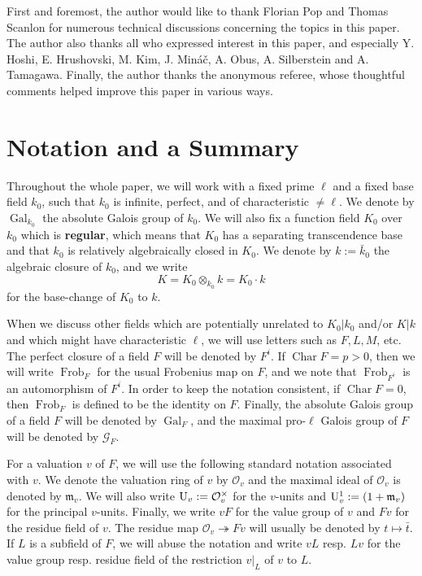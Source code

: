 \documentclass[11pt]{amsart}
\theoremstyle{definition}
\theoremstyle{remark}
\numberwithin{equation}{section}
\DeclareMathOperator{\Gal}{Gal}
\DeclareMathOperator{\Char}{Char}
\newcommand{\U}{{\rm U}}
\newcommand{\Gc}{\mathcal{G}}
\newcommand{\Oc}{\mathcal{O}}
\newcommand{\mf}{\mathfrak{m}}
\newcommand{\Frob}{\operatorname{Frob}}
\newcommand{\Galk}{{\Gal_{k_0}}}
\begin{document}
First and foremost, the author would like to thank Florian Pop and Thomas Scanlon for numerous technical discussions concerning the topics in this paper.
The author also thanks all who expressed interest in this paper, and especially Y. Hoshi, E. Hrushovski, M. Kim, J. Min\'a\v{c}, A. Obus, A. Silberstein and A. Tamagawa.
Finally, the author thanks the anonymous referee, whose thoughtful comments helped improve this paper in various ways.

\section{Notation and a Summary}
\label{section: summary}


Throughout the whole paper, we will work with a fixed prime $\ell$ and a fixed base field $k_0$, such that $k_0$ is infinite, perfect, and of characteristic $\neq \ell$.
We denote by $\Galk$ the absolute Galois group of $k_0$.
We will also fix a function field $K_0$ over $k_0$ which is {\bf regular}, which means that $K_0$ has a separating transcendence base and that $k_0$ is relatively algebraically closed in $K_0$.
We denote by $k := \bar k_0$ the algebraic closure of $k_0$, and we write 
\[ K = K_0 \otimes_{k_0} k = K_0 \cdot k \]
for the base-change of $K_0$ to $k$.

When we discuss other fields which are potentially unrelated to $K_0|k_0$ and/or $K|k$ and which might have characteristic $\ell$, we will use letters such as $F,L,M$, etc.
The perfect closure of a field $F$ will be denoted by $F^i$.
If $\Char F = p > 0$, then we will write $\Frob_F$ for the usual Frobenius map on $F$, and we note that $\Frob_{F^i}$ is an automorphism of $F^i$.
In order to keep the notation consistent, if $\Char F = 0$, then $\Frob_F$ is defined to be the identity on $F$.
Finally, the absolute Galois group of a field $F$ will be denoted by $\Gal_F$, and the maximal pro-$\ell$ Galois group of $F$ will be denoted by $\Gc_F$.

For a valuation $v$ of $F$, we will use the following standard notation associated with $v$.
We denote the valuation ring of $v$ by $\Oc_v$ and the maximal ideal of $\Oc_v$ is denoted by $\mf_v$.
We will also write $\U_v := \Oc_v^\times$ for the $v$-units and $\U_v^1 := (1+\mf_v)$ for the principal $v$-units.
Finally, we write $vF$ for the value group of $v$ and $Fv$ for the residue field of $v$.
The residue map $\Oc_v \twoheadrightarrow Fv$ will usually be denoted by $t \mapsto \bar t$.
If $L$ is a subfield of $F$, we will abuse the notation and write $vL$ resp. $Lv$ for the value group resp. residue field of the restriction $v|_L$ of $v$ to $L$.
\end{document}
